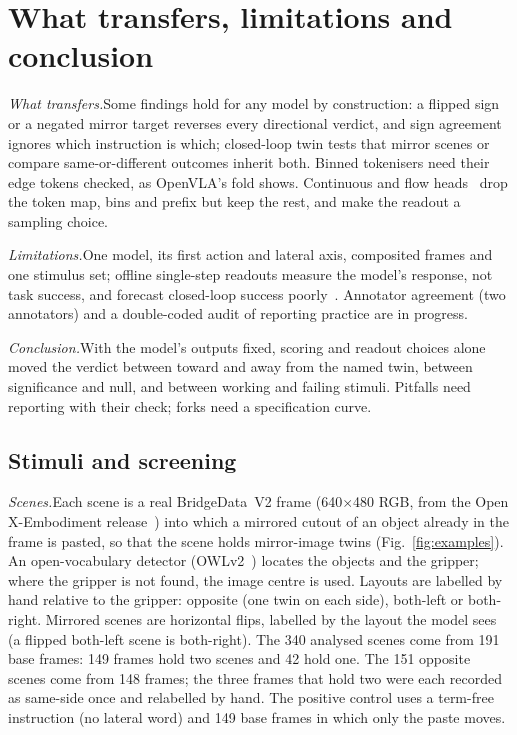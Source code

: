 \documentclass[conference]{IEEEtran}
\newcommand{\head}[1]{\textit{#1}\hspace{0.4em}}
\begin{document}
\section{What transfers, limitations and conclusion}
\label{sec:limits}

\head{What transfers.}Some findings hold for any model by construction: a flipped sign or a negated mirror target reverses every directional verdict, and sign agreement ignores which instruction is which; closed-loop twin tests that mirror scenes or compare same-or-different outcomes inherit both. Binned tokenisers need their edge tokens checked, as OpenVLA's fold shows. Continuous and flow heads~\cite{kim2025finetuning,black2025pi0} drop the token map, bins and prefix but keep the rest, and make the readout a sampling choice.

\head{Limitations.}One model, its first action and lateral axis, composited frames and one stimulus set; offline single-step readouts measure the model's response, not task success, and forecast closed-loop success poorly~\cite{li2024evaluating,wang2026reali}. Annotator agreement (two annotators) and a double-coded audit of reporting practice are in progress.

\head{Conclusion.}With the model's outputs fixed, scoring and readout choices alone moved the verdict between toward and away from the named twin, between significance and null, and between working and failing stimuli. Pitfalls need reporting with their check; forks need a specification curve.




\clearpage
\appendix

\subsection{Stimuli and screening}
\label{app:stimuli}

\head{Scenes.}Each scene is a real BridgeData~V2 frame (640$\times$480 RGB, from the Open X-Embodiment release~\cite{oneill2024open}) into which a mirrored cutout of an object already in the frame is pasted, so that the scene holds mirror-image twins (Fig.~\ref{fig:examples}). An open-vocabulary detector (OWLv2~\cite{minderer2023scaling}) locates the objects and the gripper; where the gripper is not found, the image centre is used. Layouts are labelled by hand relative to the gripper: opposite (one twin on each side), both-left or both-right. Mirrored scenes are horizontal flips, labelled by the layout the model sees (a flipped both-left scene is both-right). The 340 analysed scenes come from 191 base frames: 149 frames hold two scenes and 42 hold one. The 151 opposite scenes come from 148 frames; the three frames that hold two were each recorded as same-side once and relabelled by hand. The positive control uses a term-free instruction (no lateral word) and 149 base frames in which only the paste moves.
\end{document}
